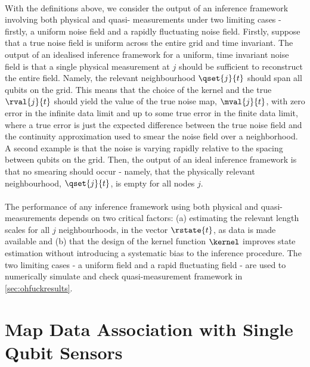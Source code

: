 \\
With the definitions above, we consider the output of an inference framework involving both physical and quasi- measurements under two limiting cases - firstly, a uniform noise field and a rapidly fluctuating noise field. Firstly, suppose that a true noise field is uniform across the entire grid and time invariant. The output of an idealised inference framework for a uniform, time invariant noise field is that a single physical measurement at $j$ should be sufficient to reconstruct the entire field. Namely, the relevant neighbourhood $\qset{j}{t}$ should span all qubits on the grid. This means that the choice of the kernel and the true $\rval{j}{t}$ should yield the value of the true noise map, $\mval{j}{t}$, with zero error in the infinite data limit and up to some true error in the finite data limit, where a true error is just the expected difference between the true noise field and the continuity approximation used to smear the noise field over a neighborhood. A second example is that the noise is varying rapidly relative to the spacing between qubits on the grid. Then, the output of an ideal inference framework is that no smearing should occur - namely, that the physically relevant neighbourhood, $\qset{j}{t}$, is empty for all nodes $j$. \\
\\
The performance of any inference framework using both physical and quasi-measurements depends on two critical factors: (a) estimating the relevant length scales for all $j$ neighbourhoods, in the vector $\rstate{t}$, as data is made available and (b) that the design of the kernel function $\kernel$ improves state estimation without introducing a systematic bias to the inference procedure. The two limiting cases - a uniform field and a rapid fluctuating field - are used to numerically simulate and check quasi-measurement framework in \cref{sec:ohfuckresults}.  

\section{Map Data Association with Single Qubit Sensors} \label{sec:mapdataassocation}

